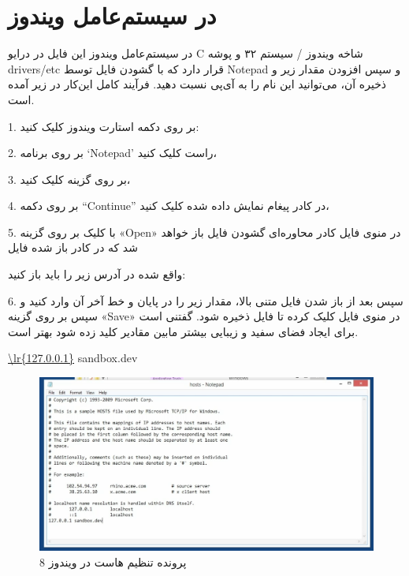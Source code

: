 \begin{latin}
    
\end{latin}
\section{در سیستم‌عامل ویندوز}
در سیستم‌عامل ویندوز این فایل در درایو C شاخه ویندوز / سیستم  ۳۲ و پوشه drivers/etc قرار دارد که با گشودن فایل توسط Notepad و سپس افزودن مقدار زیر و ذخیره آن، می‌توانید این نام را به آی‌پی 
 نسبت دهید. فرآیند کامل این‌کار در زیر آمده است.

1. بر روی دکمه استارت ویندوز کلیک کنید:

2. بر روی برنامه ‘Notepad’ راست کلیک کنید،

3. بر روی گزینه 
 کلیک کنید،
 
4. بر روی دکمه  “Continue” در کادر پیغام نمایش داده شده کلیک کنید،

5. با کلیک بر روی گزینه «Open» در منوی فایل کادر محاوره‌ای گشودن فایل باز خواهد شد که در کادر باز شده فایل 

 واقع شده در آدرس زیر را باید باز کنید:
\\

\begin{latin}
    
\end{latin}
6. سپس بعد از باز شدن فایل متنی بالا، مقدار زیر را در پایان و خط آخر آن وارد کنید و سپس بر روی گزینه «Save» در منوی فایل کلیک کرده تا فایل ذخیره شود. گفتنی است برای ایجاد فضای سفید و زیبایی بیشتر مابین مقادیر کلید 
 زده شود بهتر است.
\begin{latin}
    \url{\lr{127.0.0.1}}       sandbox.dev
\end{latin}

\begin{figure}
    \includegraphics[width=.9\textwidth ,height=.55\textwidth]{Pic/WinHost}
    \caption{ پرونده تنظیم هاست در ویندوز 8}
    \label{win-hosts}
\end{figure}

